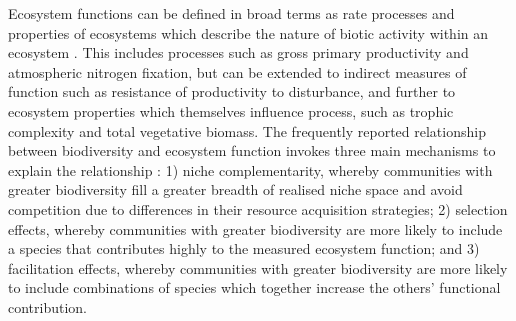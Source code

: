 \documentclass[11pt,a4paper]{article}
\begin{document}
Ecosystem functions can be defined in broad terms as rate processes and properties of ecosystems which describe the nature of biotic activity within an ecosystem \citep{Jax2005}. This includes processes such as gross primary productivity and atmospheric nitrogen fixation, but can be extended to indirect measures of function such as resistance of productivity to disturbance, and further to ecosystem properties which themselves influence process, such as trophic complexity and total vegetative biomass. The frequently reported  relationship between biodiversity and ecosystem function invokes three main mechanisms to explain the relationship \citep{Tilman2014}: 1) niche complementarity, whereby communities with greater biodiversity fill a greater breadth of realised niche space and avoid competition due to differences in their resource acquisition strategies; 2) selection effects, whereby communities with greater biodiversity are more likely to include a species that contributes highly to the measured ecosystem function; and 3) facilitation effects, whereby communities with greater biodiversity are more likely to include combinations of species which together increase the others' functional contribution.
\end{document}
